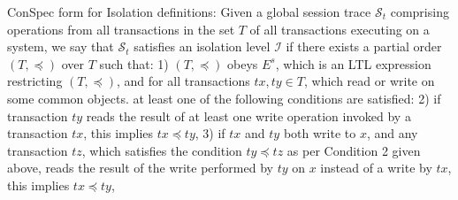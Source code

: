 \documentclass[acmlarge, ,11pt]{acmart}
\begin{document}
  \begin{definition}{ConSpec form for Isolation definitions:}\label{def:form0} 
Given a global session trace $\mathcal{S}_t$ comprising %
 operations from all transactions in the set $T$ of all transactions executing on a system, %
we say  that   $\mathcal{S}_t$ satisfies an isolation level $\mathcal{I}$
 if there exists a partial order  $\left( T, \preccurlyeq \right)$ over $T$ %
 such that:  %
 1) $\left( T, \preccurlyeq \right)$ obeys $E^s$, which is an LTL expression restricting $\left( T, \preccurlyeq \right)$, and for all transactions $\mathit{tx}, \mathit{ty} \in T$, which read or write on some common objects. at least one of the following conditions are satisfied: 
 2) %
if transaction $ {\mathit{ty}}$ reads the result of at least one write operation invoked by a transaction $ {\mathit{tx}}$, this  implies $\mathit{tx} \preccurlyeq \mathit{ty}$, %
   3)  if $\mathit{tx}$ and  $ {\mathit{ty}}$ both write to $x$, and any transaction  $\mathit{tz}$, which satisfies the condition $\mathit{ty} \preccurlyeq \mathit{tz}$ as per Condition 2 given above, reads the result of the write performed by $\mathit{ty}$ on $x$ instead of a write by  $\mathit{tx}$, this  implies $\mathit{tx} \preccurlyeq \mathit{ty}$, %

\end{definition}
\end{document}
